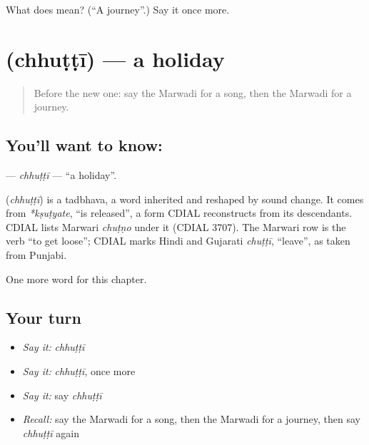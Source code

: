 \begin{tcolorbox}[breakable,colback=teal!4,colframe=teal!35!black,title={Before you move on}]
What does  mean? (\textquotedblleft{}A journey\textquotedblright{}.) Say it once more.
\end{tcolorbox}
\section[\texorpdfstring{\mw{छुट्टी} (chhuṭṭī)}{छुट्टी (chhuṭṭī)}]{ (chhuṭṭī) — a holiday}

\label{lesson:MW-C88-chhutti}



\begin{quote}
Before the new one: say the Marwadi for a song, then the Marwadi for a journey.
\end{quote}

\subsection*{You'll want to know: }
\textbf{} — \emph{chhuṭṭī} — \textquotedblleft{}a holiday\textquotedblright{}.

\begin{cousinweb}
\textbf{} (\emph{chhuṭṭī}) is a tadbhava, a word inherited and reshaped by sound change. It comes from \emph{*kṣuṭyate}, \textquotedblleft{}is released\textquotedblright{}, a form CDIAL reconstructs from its descendants. CDIAL lists Marwari \emph{chuṭṇo} under it (CDIAL 3707). The Marwari row is the verb \textquotedblleft{}to get loose\textquotedblright{}; CDIAL marks Hindi and Gujarati \emph{chuṭṭī}, \textquotedblleft{}leave\textquotedblright{}, as taken from Punjabi.
\end{cousinweb}

\begin{grammarlens}[title={What you've built}]
One more word for this chapter.
\end{grammarlens}

\subsection*{Your turn}
\begin{itemize}
\raggedright
  \item \emph{Say it:} \emph{chhuṭṭī}
  \item \emph{Say it:} \emph{chhuṭṭī}, once more
  \item \emph{Say it:} say \emph{chhuṭṭī}
  \item \emph{Recall:} say the Marwadi for a song, then the Marwadi for a journey, then say \emph{chhuṭṭī} again
\end{itemize}

